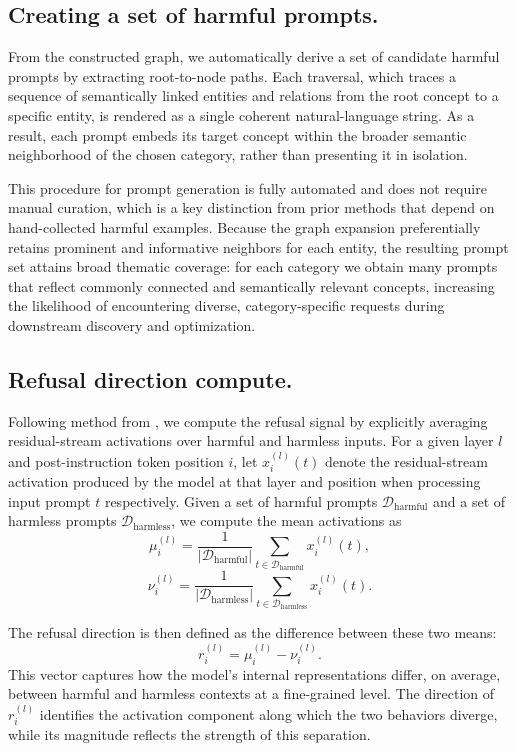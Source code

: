 \documentclass{article}
\theoremstyle{plain}
\theoremstyle{definition}
\theoremstyle{remark}
\begin{document}
\subsection{Creating a set of harmful prompts.} \label{subsec:prompt_gen}
From the constructed graph, we automatically derive a set of candidate harmful prompts by extracting root-to-node paths. Each traversal, which traces a sequence of semantically linked entities and relations from the root concept to a specific entity, is rendered as a single coherent natural-language string. As a result, each prompt embeds its target concept within the broader semantic neighborhood of the chosen category, rather than presenting it in isolation.

This procedure for prompt generation is fully automated and does not require manual curation, which is a key distinction from prior methods that depend on hand-collected harmful examples. Because the graph expansion preferentially retains prominent and informative neighbors for each entity, the resulting prompt set attains broad thematic coverage: for each category we obtain many prompts that reflect commonly connected and semantically relevant concepts, increasing the likelihood of encountering diverse, category-specific requests during downstream discovery and optimization.

\subsection{Refusal direction compute.} \label{subsec:preliminaries}
Following method from \cite{arditi2024refusal}, we compute the refusal signal by explicitly averaging residual-stream activations over harmful and harmless inputs. For a given layer $l$ and post-instruction token position $i$, let $x^{(l)}_i(t)$ denote the residual-stream activation produced by the model at that layer and position when processing input prompt $t$ respectively. Given a set of harmful prompts $\mathcal{D}_{\text{harmful}}$ and a set of harmless prompts $\mathcal{D}_{\text{harmless}}$, we compute the mean activations as
\[
\mu^{(l)}_{i} = \frac{1}{|\mathcal{D}_{\text{harmful}}|}
\sum_{t \in \mathcal{D}_{\text{harmful}}} x^{(l)}_{i}(t),
\]\[
\nu^{(l)}_{i} = \frac{1}{|\mathcal{D}_{\text{harmless}}|}
\sum_{t \in \mathcal{D}_{\text{harmless}}} x^{(l)}_{i}(t).
\]

The refusal direction is then defined as the difference between these two means:
\[
r^{(l)}_{i} = \mu^{(l)}_{i} - \nu^{(l)}_{i}.
\]
This vector captures how the model’s internal representations differ, on average, between harmful and harmless contexts at a fine-grained level. The direction of $r^{(l)}_{i}$ identifies the activation component along which the two behaviors diverge, while its magnitude reflects the strength of this separation. 
\end{document}
